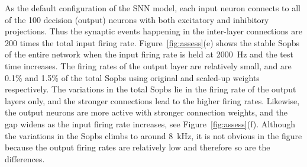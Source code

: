 \documentclass{frontiersENG} %
\begin{document}
As the default configuration of the SNN model, each input neuron connects to all of the 100 decision (output) neurons with both excitatory and inhibitory projections.
Thus the synaptic events happening in the inter-layer connections are 200 times the total input firing rate.
Figure~\ref{fig:assess}(e) shows the stable Sopbs of the entire network when the input firing rate is held at 2000~Hz and the test time increases.
The firing rates of the output layer are relatively small, and are 0.1\% and 1.5\% of the total Sopbs using original and scaled-up weights respectively.
The variations in the total Sopbs lie in the firing rate of the output layers only, and the stronger connections lead to the higher firing rates.
Likewise, the output neurons are more active with stronger connection weights, and the gap widens as the input firing rate increases, see Figure~\ref{fig:assess}(f).
Although the variations in the Sopbs climbs to around 8~kHz, it is not obvious in the figure because the output firing rates are relatively low and therefore so are the differences.
\end{document}
